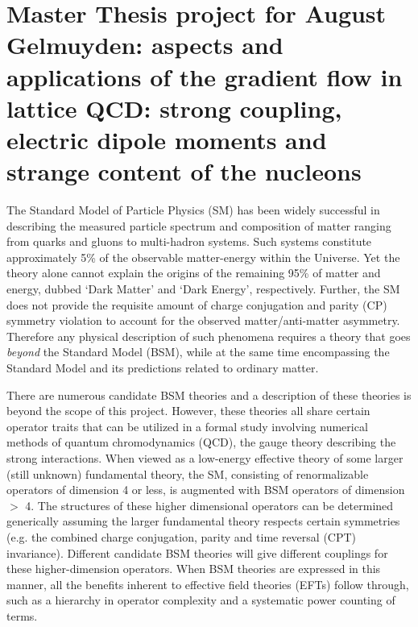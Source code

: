 \documentclass[aps,prc,twocolumn,showpacs,floatfix,nofootinbib,preprintnumbers,superscriptaddress,amsmath,amssymb]{revtex4-1}
\begin{document}
\pagestyle{plain}

\section*{Master Thesis project for August Gelmuyden: aspects and applications of the gradient flow in lattice QCD: 
strong coupling, electric dipole moments and strange content of the nucleons}

The Standard Model of Particle Physics (SM) has been widely successful in describing 
the measured particle spectrum and composition of matter ranging from quarks and gluons 
to multi-hadron systems.  Such systems constitute approximately 5\% of the observable 
matter-energy within the Universe.  Yet the theory alone cannot explain the origins of 
the remaining 95\% of matter and energy, dubbed `Dark Matter' and `Dark Energy', respectively.  
Further, the SM does not provide the requisite amount of charge conjugation and parity (CP) 
symmetry violation to account for the observed matter/anti-matter asymmetry.  Therefore any physical description of such 
phenomena requires a theory that goes \emph{beyond} the Standard Model (BSM), while at the 
same time encompassing the Standard Model and its predictions related to ordinary matter.

There are numerous candidate BSM theories and a description of these theories is 
beyond the scope of this project.  However, these theories all share certain operator 
traits that can be utilized in a formal study involving numerical methods of 
quantum chromodynamics (QCD), the gauge theory describing the strong interactions.  
When viewed as a low-energy effective theory of some larger (still unknown) fundamental theory, 
the SM, consisting of renormalizable operators of dimension 4 or less, 
is augmented with BSM operators of dimension $>$ 4.  The structures of these higher 
dimensional operators can be determined generically assuming the larger fundamental theory 
respects certain symmetries (e.g. the combined charge conjugation, parity and time reversal (CPT) invariance). 
Different candidate BSM theories will give different couplings for these higher-dimension operators.  When BSM theories 
are expressed in this manner, all the benefits inherent to effective field theories (EFTs) follow through, 
such as a hierarchy in operator complexity and a systematic power counting of terms.
\end{document}
